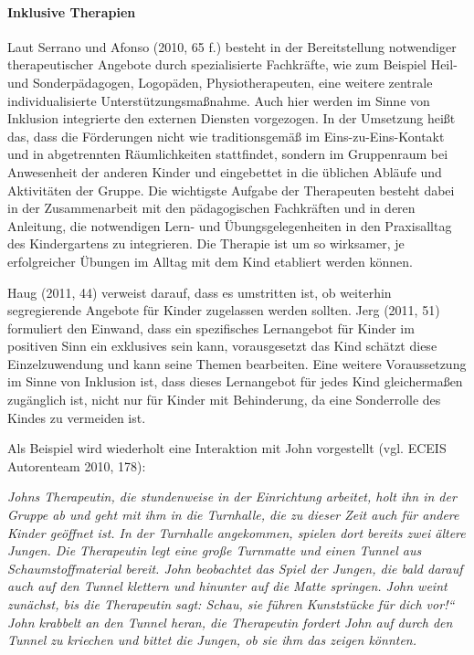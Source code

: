 \paragraph{Inklusive Therapien} Laut Serrano und Afonso (2010, 65 f.) besteht in der Bereitstellung notwendiger therapeutischer Angebote durch spezialisierte Fachkräfte, wie zum Beispiel Heil- und Sonderpädagogen, Logopäden, Physiotherapeuten, eine weitere zentrale individualisierte Unterstützungsmaßnahme. Auch hier werden im Sinne von Inklusion integrierte den externen Diensten vorgezogen. In der Umsetzung heißt das, dass die Förderungen nicht wie traditionsgemäß im Eins-zu-Eins-Kontakt und in abgetrennten Räumlichkeiten stattfindet, sondern im Gruppenraum bei Anwesenheit der anderen Kinder und eingebettet in die üblichen Abläufe und Aktivitäten der Gruppe. Die wichtigste Aufgabe der Therapeuten besteht dabei in der Zusammenarbeit mit den pädagogischen Fachkräften und in deren Anleitung, die notwendigen Lern- und Übungsgelegenheiten in den Praxisalltag des Kindergartens zu integrieren. Die Therapie ist um so wirksamer, je erfolgreicher Übungen im Alltag mit dem Kind etabliert werden können.

Haug (2011, 44) verweist darauf, dass es umstritten ist, ob weiterhin segregierende Angebote für Kinder zugelassen werden sollten. Jerg (2011, 51) formuliert den Einwand, dass ein spezifisches Lernangebot für Kinder im positiven Sinn ein exklusives sein kann, vorausgesetzt das Kind schätzt diese Einzelzuwendung und kann seine Themen bearbeiten. Eine weitere Voraussetzung im Sinne von Inklusion ist, dass dieses Lernangebot für jedes Kind gleichermaßen zugänglich ist, nicht nur für Kinder mit Behinderung, da eine Sonderrolle des Kindes zu vermeiden ist. 

Als Beispiel wird wiederholt eine Interaktion mit John vorgestellt (vgl. ECEIS Autorenteam 2010, 178):

\emph{Johns Therapeutin, die stundenweise in der Einrichtung arbeitet, holt ihn in der Gruppe ab und geht mit ihm in die Turnhalle, die zu dieser Zeit auch für andere Kinder geöffnet ist. In der Turnhalle angekommen, spielen dort bereits zwei ältere Jungen. Die Therapeutin legt eine große Turnmatte und einen Tunnel aus Schaumstoffmaterial bereit. John beobachtet das Spiel der Jungen, die bald darauf auch auf den Tunnel klettern und hinunter auf die Matte springen. John weint zunächst, bis die Therapeutin sagt: Schau, sie führen Kunststücke für dich vor!“ John krabbelt an den Tunnel heran, die Therapeutin fordert John auf durch den Tunnel zu kriechen und bittet die Jungen, ob sie ihm das zeigen könnten.}

